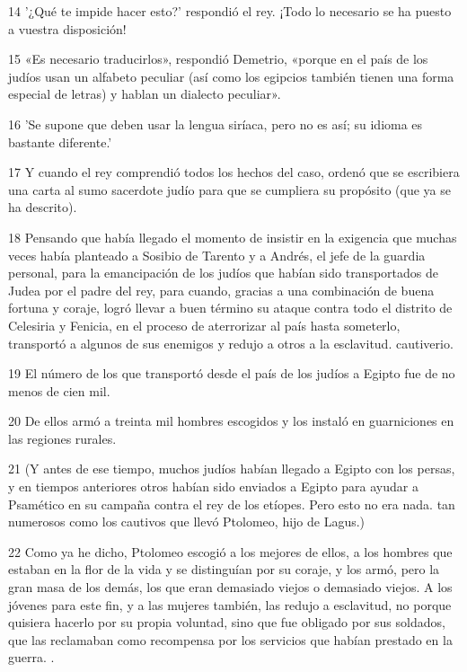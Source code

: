 \par 14 '¿Qué te impide hacer esto?' respondió el rey. ¡Todo lo necesario se ha puesto a vuestra disposición!

\par 15 «Es necesario traducirlos», respondió Demetrio, «porque en el país de los judíos usan un alfabeto peculiar (así como los egipcios también tienen una forma especial de letras) y hablan un dialecto peculiar».

\par 16 'Se supone que deben usar la lengua siríaca, pero no es así; su idioma es bastante diferente.'

\par 17 Y cuando el rey comprendió todos los hechos del caso, ordenó que se escribiera una carta al sumo sacerdote judío para que se cumpliera su propósito (que ya se ha descrito).

\par 18 Pensando que había llegado el momento de insistir en la exigencia que muchas veces había planteado a Sosibio de Tarento y a Andrés, el jefe de la guardia personal, para la emancipación de los judíos que habían sido transportados de Judea por el padre del rey, para cuando, gracias a una combinación de buena fortuna y coraje, logró llevar a buen término su ataque contra todo el distrito de Celesiria y Fenicia, en el proceso de aterrorizar al país hasta someterlo, transportó a algunos de sus enemigos y redujo a otros a la esclavitud. cautiverio.

\par 19 El número de los que transportó desde el país de los judíos a Egipto fue de no menos de cien mil.

\par 20 De ellos armó a treinta mil hombres escogidos y los instaló en guarniciones en las regiones rurales.

\par 21 (Y antes de ese tiempo, muchos judíos habían llegado a Egipto con los persas, y en tiempos anteriores otros habían sido enviados a Egipto para ayudar a Psamético en su campaña contra el rey de los etíopes. Pero esto no era nada. tan numerosos como los cautivos que llevó Ptolomeo, hijo de Lagus.)

\par 22 Como ya he dicho, Ptolomeo escogió a los mejores de ellos, a los hombres que estaban en la flor de la vida y se distinguían por su coraje, y los armó, pero la gran masa de los demás, los que eran demasiado viejos o demasiado viejos. A los jóvenes para este fin, y a las mujeres también, las redujo a esclavitud, no porque quisiera hacerlo por su propia voluntad, sino que fue obligado por sus soldados, que las reclamaban como recompensa por los servicios que habían prestado en la guerra. .

